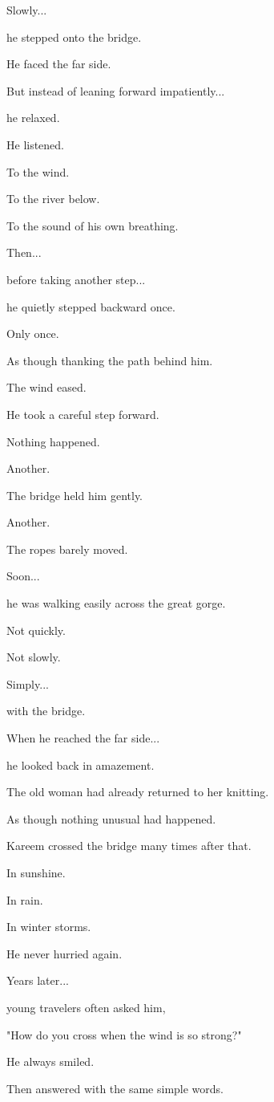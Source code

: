 \documentclass[12pt,openany]{book}
\begin{document}
Slowly...

he stepped onto the bridge.

He faced the far side.

But instead of leaning forward impatiently...

he relaxed.

He listened.

To the wind.

To the river below.

To the sound of his own breathing.

Then...

before taking another step...

he quietly stepped backward once.

Only once.

As though thanking the path behind him.

The wind eased.

He took a careful step forward.

Nothing happened.

Another.

The bridge held him gently.

Another.

The ropes barely moved.

Soon...

he was walking easily across the great gorge.

Not quickly.

Not slowly.

Simply...

with the bridge.

When he reached the far side...

he looked back in amazement.

The old woman had already returned to her knitting.

As though nothing unusual had happened.

Kareem crossed the bridge many times after that.

In sunshine.

In rain.

In winter storms.

He never hurried again.

Years later...

young travelers often asked him,

"How do you cross when the wind is so strong?"

He always smiled.

Then answered with the same simple words.
\end{document}
